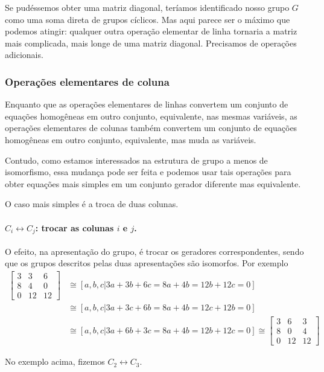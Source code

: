 \documentclass[a4paper,portuguese,11pt,twoside, leqno]{book}
\theoremstyle{definition}
\begin{document}
	\par\vspace{0.3cm} Se pudéssemos obter uma matriz diagonal, teríamos identificado nosso grupo $G$ como uma soma direta de grupos cíclicos. Mas aqui parece ser o máximo que podemos atingir: qualquer outra operação elementar de linha tornaria a matriz mais complicada, mais longe de uma matriz diagonal. Precisamos de operações adicionais.
	
	\subsubsection{Operações elementares de coluna}
	\hspace{12pt} Enquanto que as operações elementares de linhas convertem um conjunto de equações homogêneas em outro conjunto, equivalente, nas mesmas variáveis, as operações elementares de colunas também convertem um conjunto de  equações homogêneas em outro conjunto, equivalente, mas muda as variáveis.
	\par\vspace{0.3cm} Contudo, como estamos interessados na estrutura de grupo a menos de isomorfismo, essa mudança pode ser feita e podemos usar tais operações para obter equações mais simples em um conjunto gerador diferente mas equivalente.
	\par\vspace{0.3cm} O caso mais simples é a troca de duas colunas. 
	\paragraph{$C_i\leftrightarrow C_j$: trocar as colunas $i$ e $j$.} O efeito, na apresentação do grupo, é trocar os geradores correspondentes, sendo que os grupos descritos pelas duas apresentações são isomorfos. Por exemplo
	\begin{align*}
	\begin{bmatrix}
	3 & 3 & 6 \\
	8 & 4 & 0 \\
	0 & 12 & 12
	\end{bmatrix} &\cong [ a,b,c \vert 3a+3b+6c=8a+4b=12b+12c=0 ] \\ &\cong [ a,b,c \vert 3a+3c+6b=8a+4b=12c+12b=0 ] \\ &\cong [ a,b,c \vert 3a+6b+3c=8a+4b=12b+12c=0 ] \cong \begin{bmatrix}
	3 & 6 & 3 \\
	8 & 0 & 4 \\
	0 & 12 & 12
	\end{bmatrix}
	\end{align*}
	\par\vspace{0.3cm} No exemplo acima, fizemos $C_2\leftrightarrow C_3$.
\end{document}
